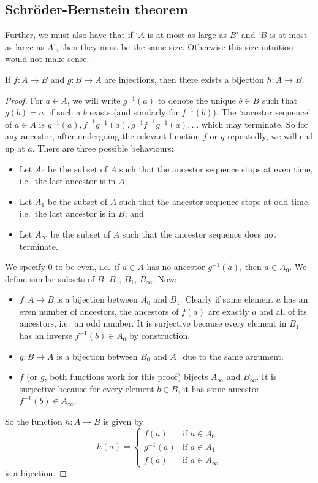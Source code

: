 \subsection{Schr\"oder-Bernstein theorem}
Further, we must also have that if `\(A\) is at most as large as \(B\)' and `\(B\) is at most as large as \(A\)', then they must be the same size.
Otherwise this size intuition would not make sense.
\begin{theorem}
	If \(f\colon A\to B\) and \(g\colon B\to A\) are injections, then there exists a bijection \(h\colon A\to B\).
\end{theorem}
\begin{proof}
	For \(a\in A\), we will write \(g^{-1}(a)\) to denote the unique \(b \in B\) such that \(g(b) = a\), if such a \(b\) exists (and similarly for \(f^{-1}(b)\)).
	The `ancestor sequence' of \(a \in A\) is \(g^{-1}(a), f^{-1}g^{-1}(a), g^{-1}f^{-1}g^{-1}(a), \dots\) which may terminate.
	So for any ancestor, after undergoing the relevant function \(f\) or \(g\) repeatedly, we will end up at \(a\).
	There are three possible behaviours:
	\begin{itemize}
		\item Let \(A_0\) be the subset of \(A\) such that the ancestor sequence stops at even time, i.e.\ the last ancestor is in \(A\);
		\item Let \(A_1\) be the subset of \(A\) such that the ancestor sequence stops at odd time, i.e.\ the last ancestor is in \(B\); and
		\item Let \(A_\infty\) be the subset of \(A\) such that the ancestor sequence does not terminate.
	\end{itemize}
	We specify 0 to be even, i.e.\ if \(a\in A\) has no ancestor \(g^{-1}(a)\), then \(a \in A_0\).
	We define similar subsets of \(B\): \(B_0\), \(B_1\), \(B_\infty\).
	Now:
	\begin{itemize}
		\item \(f\colon A \to B\) is a bijection between \(A_0\) and \(B_1\).
		      Clearly if some element \(a\) has an even number of ancestors, the ancestors of \(f(a)\) are exactly \(a\) and all of its ancestors, i.e.\ an odd number.
		      It is surjective because every element in \(B_1\) has an inverse \(f^{-1}(b) \in A_0\) by construction.
		\item \(g\colon B \to A\) is a bijection between \(B_0\) and \(A_1\) due to the same argument.
		\item \(f\) (or \(g\), both functions work for this proof) bijects \(A_\infty\) and \(B_\infty\).
		      It is surjective because for every element \(b \in B\), it has some ancestor \(f^{-1}(b) \in A_\infty\).
	\end{itemize}
	So the function \(h\colon A \to B\) is given by
	\[
		h(a) = \begin{cases}
			f(a)      & \text{if } a \in A_0      \\
			g^{-1}(a) & \text{if } a \in A_1      \\
			f(a)      & \text{if } a \in A_\infty
		\end{cases}
	\]
	is a bijection.
\end{proof}

